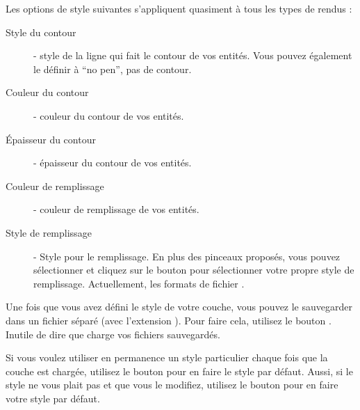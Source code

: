 Les options de style suivantes s'appliquent quasiment \`a tous les types de rendus :
\begin{description}
\item[Style du contour] - style de la ligne qui fait le contour de vos entit\'es. Vous pouvez \'egalement le d\'efinir \`a ``no pen'', pas de contour.
\item[Couleur du contour] - couleur du contour de vos entit\'es.
\item[\'Epaisseur du contour] - \'epaisseur du contour de vos entit\'es.
\item[Couleur de remplissage] - couleur de remplissage de vos entit\'es.
\item[Style de remplissage] - Style pour le remplissage. En plus des pinceaux propos\'es, vous pouvez s\'electionner  et cliquez sur le \browsebutton bouton pour s\'electionner votre propre style de remplissage. Actuellement, les formats de fichier .
\end{description}

Une fois que vous avez d\'efini le style de votre couche, vous pouvez le sauvegarder dans un fichier s\'epar\'e (avec l'extension ). Pour faire cela, utilisez le bouton . Inutile de dire que  charge vos fichiers sauvegard\'es.

Si vous voulez utiliser en permanence un style particulier chaque fois que la couche est charg\'ee, utilisez le bouton  pour en faire le style par d\'efaut. Aussi, si le style ne vous plait pas et que vous le modifiez, utilisez le bouton  pour en faire votre style par d\'efaut.


